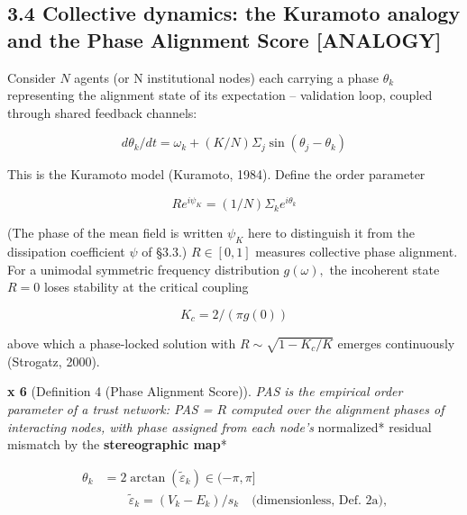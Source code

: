\documentclass[
]{article}
\begin{document}
\subsection{3.4 Collective dynamics: the Kuramoto analogy and the Phase
Alignment Score
{[}ANALOGY{]}}\label{collective-dynamics-the-kuramoto-analogy-and-the-phase-alignment-score-analogy}

Consider \(N\) agents (or N institutional nodes) each carrying a phase
\(\theta_k\) representing the alignment state of its expectation --
validation loop, coupled through shared feedback channels:

\begin{equation}
d\theta_k/dt = \omega_k + (K/N) \Sigma_j \sin(\theta_j - \theta_k)
\label{eq:kuramoto}
\end{equation}

This is the Kuramoto model (Kuramoto, 1984). Define the order parameter

\begin{equation}
R e^{i\psi_K} = (1/N) \Sigma_k e^{i\theta_k}
\label{eq:order}
\end{equation}

(The phase of the mean field is written \(\psi_K\) here to distinguish
it from the dissipation coefficient \(\psi\) of §3.3.) \(R \in [0, 1]\)
measures collective phase alignment. For a unimodal symmetric frequency
distribution \(g(\omega),\) the incoherent state \(R = 0\) loses
stability at the critical coupling

\begin{equation}
K_c = 2 / (\pi g(0))
\label{eq:kc}
\end{equation}

above which a phase-locked solution with \(R \sim \sqrt{1 - K_c/K}\)
emerges continuously (Strogatz, 2000).

\textbf{x 6} (Definition 4 (Phase Alignment Score)). \emph{PAS is the
empirical order parameter of a trust network: PAS = \(R\) computed over
the alignment phases of interacting nodes, with phase assigned from each
node's }normalized* residual mismatch by the \textbf{stereographic map}*

\begin{equation}
\begin{split}
\theta_k &= 2 \arctan(\tilde{\varepsilon}_k) \in (-\pi, \pi]\\
&\qquad \tilde{\varepsilon}_k = (V_k - E_k)/s_k \quad \text{(dimensionless, Def.~2a),}
\end{split}
\label{eq:pasmap}
\end{equation}
\end{document}
